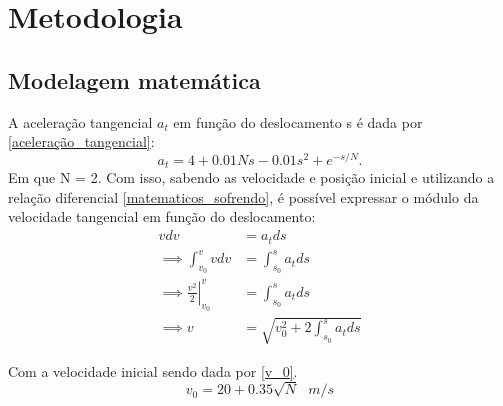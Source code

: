 \documentclass[12pt,a4paper]{article}
\begin{document}
\section{Metodologia}

\vspace{0.5\baselineskip}
\subsection{Modelagem matemática}
\noindent A aceleração tangencial $a_t$ em função do deslocamento s é dada por \eqref{aceleração_tangencial}:
\begin{equation}
    \label{aceleração_tangencial}
    a_t = 4+0.01Ns - 0.01s^2 + e^{-s/N}.
\end{equation}
Em que N = 2. Com isso, sabendo as velocidade e posição inicial e utilizando a relação diferencial \eqref{matematicos_sofrendo}, é possível expressar o módulo da velocidade tangencial em função do deslocamento:
\begin{align}
    \label{matematicos_sofrendo}
    vdv &= a_tds \\ \nonumber
    \implies \int_{v_0}^{v} vdv &= \int_{s_0}^{s} a_tds \\ \nonumber
    \implies \left. \frac{v^2}{2} \right|_{v_0}^{v} &= \int_{s_0}^{s} a_tds \\
    \label{torriceli_melhorado}
    \implies v &= \sqrt{v_0^2 + 2\int_{s_0}^{s} a_tds}
\end{align}

Com a velocidade inicial sendo dada por \eqref{v_0}.
\begin{equation}
    \label{v_0}
    v_0 = 20 + 0.35\sqrt{N} \text{ }m/s
\end{equation}
\end{document}
